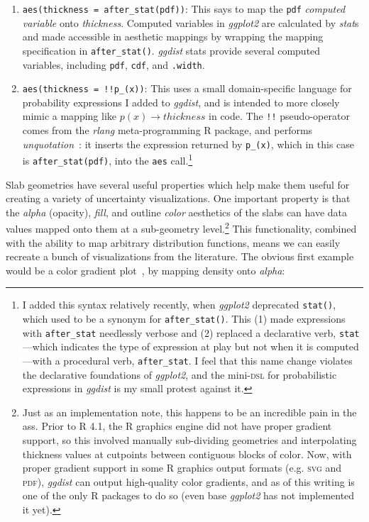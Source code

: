\documentclass[journal]{vgtc}                     %
\begin{document}
\begin{enumerate}
    \item \texttt{aes(thickness = after\_stat(pdf))}: This says to map the \texttt{pdf} \textit{computed variable} onto \textit{thickness}. Computed variables in \textit{ggplot2} are calculated by \textit{stat}s and made accessible in aesthetic mappings by wrapping the mapping specification in \texttt{after\_stat()}. \textit{ggdist} stats provide several computed variables, including \texttt{pdf}, \texttt{cdf}, and \texttt{.width}.
    \item \texttt{aes(thickness = !!p\_(x))}:  This uses a small domain-specific language for probability expressions I added to \textit{ggdist}, and is intended to more closely mimic a mapping like $p(x) \rightarrow thickness$ in code. The \texttt{!!} pseudo-operator comes from the \textit{rlang} meta-programming R package, and performs \textit{unquotation}~\cite{wickham2019advanced}: it inserts the expression returned by \texttt{p\_(x)}, which in this case is \texttt{after\_stat(pdf)}, into the \texttt{aes} call.\footnote{I added this syntax relatively recently, when \textit{ggplot2} deprecated \texttt{stat()}, which used to be a synonym for \texttt{after\_stat()}. This (1) made expressions with \texttt{after\_stat} needlessly verbose and (2) replaced a declarative verb, \texttt{stat}---which indicates the type of expression at play but not when it is computed---with a procedural verb, \texttt{after\_stat}. I feel that this name change violates the declarative foundations of \textit{ggplot2}, and the mini-\textsc{dsl} for probabilistic expressions in \textit{ggdist} is my small protest against it.}
\end{enumerate}

Slab geometries have several useful properties which help make them useful for creating a variety of uncertainty visualizations. One important property is that the \textit{alpha} (opacity), \textit{fill}, and outline \textit{color} aesthetics of the slabs can have data values mapped onto them at a sub-geometry level.\footnote{Just as an implementation note, this happens to be an incredible pain in the ass. Prior to R 4.1, the R graphics engine did not have proper gradient support, so this involved manually sub-dividing geometries and interpolating thickness values at cutpoints between contiguous blocks of color. Now, with proper gradient support in some R graphics output formats (e.g. \textsc{svg} and \textsc{pdf}), \textit{ggdist} can output high-quality color gradients, and as of this writing is one of the only R packages to do so (even base \textit{ggplot2} has not implemented it yet).} This functionality, combined with the ability to map arbitrary distribution functions, means we can easily recreate a bunch of visualizations from the literature. The obvious first example would be a color gradient plot~\cite{jackson2008displaying}, by mapping density onto \textit{alpha}:
\end{document}
